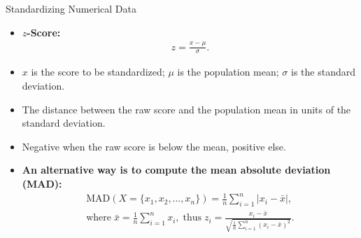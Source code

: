 \begin{frame}{Standardizing Numerical Data}
	\begin{itemize}
		\item \textbf{$z$-Score:}
		      \begin{align*}
			      z = \frac{x-\mu}{\sigma}.
		      \end{align*}
		\item $x$ is the score to be standardized; $\mu$ is the population mean; $\sigma$ is the standard deviation.
		\item The distance between the raw score and the population mean in units of the standard deviation.
		\item Negative when the raw score is below the mean, positive else.
		\item \textbf{An alternative way is to compute the mean absolute deviation (MAD):}
		      \begin{align*}
			      \text{MAD}(X = \{x_1,x_2,\ldots,x_n\}) = \frac{1}{n} \sum_{i=1}^{n} \vert x_i - \bar{x} \vert, \\
			      \text{where} \; \bar{x} = \frac{1}{n} \sum_{i=1}^{n}x_i, \; \text{thus} \; z_i = \frac{x_i-\bar{x}}{\sqrt{\frac{1}{n}\sum_{i=1}^{n}(x_i-\bar{x})^2}}.
		      \end{align*}
	\end{itemize}
\end{frame}

